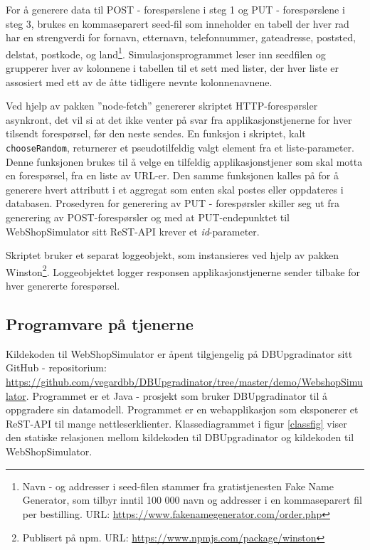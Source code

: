 For å generere data til POST - forespørslene i steg 1 og PUT - forespørslene i steg 3, brukes en komma\-separert seed-fil som inneholder en tabell der hver rad har en strengverdi for fornavn, etternavn, telefonnummer, gateadresse, poststed, delstat, postkode, og land\footnote{Navn - og addresser i seed-filen stammer fra gratistjenesten Fake Name Generator, som tilbyr inntil 100 000 navn og addresser i en kommaseparert fil per bestilling. URL: \url{https://www.fakenamegenerator.com/order.php}}. Simulasjonsprogrammet leser inn seedfilen og grupperer hver av kolonnene i tabellen til et sett med lister, der hver liste er assosiert med ett av de åtte tidligere nevnte kolonnenavnene.

Ved hjelp av pakken ''node-fetch'' genererer skriptet HTTP-forespørsler asynkront, det vil si at det ikke venter på svar fra applikasjonstjenerne for hver tilsendt forespørsel, før den neste sendes. En funksjon i skriptet, kalt \texttt{chooseRandom}, returnerer et pseudotilfeldig valgt element fra et liste-parameter. Denne funksjonen brukes til å velge en tilfeldig applikasjonstjener som skal motta en forespørsel, fra en liste av URL-er. Den samme funksjonen kalles på for å generere hvert attributt i et aggregat som enten skal postes eller oppdateres i databasen. Prosedyren for generering av PUT - forespørsler skiller seg ut fra generering av POST-forespørsler og med at PUT-endepunktet til WebShopSimulator sitt ReST-API krever et \emph{id}-parameter.

Skriptet bruker et separat loggeobjekt, som instansieres ved hjelp av pakken Winston\footnote{Publisert på npm. URL: \url{https://www.npmjs.com/package/winston}}. Loggeobjektet logger responsen applikasjonstjenerne sender tilbake for hver genererte forespørsel.

\subsection{Programvare på tjenerne}

Kildekoden til WebShopSimulator er åpent tilgjengelig på DBUpgradinator sitt GitHub - repositorium: \url{https://github.com/vegardbb/DBUpgradinator/tree/master/demo/WebshopSimulator}. Programmet er et Java - prosjekt som bruker DBUpgradinator til å oppgradere sin datamodell. Programmet er en webapplikasjon som eksponerer et ReST-API til mange nettleserklienter. Klassediagrammet i figur \ref{classfig} viser den statiske relasjonen mellom kildekoden til DBUpgradinator og kildekoden til WebShopSimulator.

